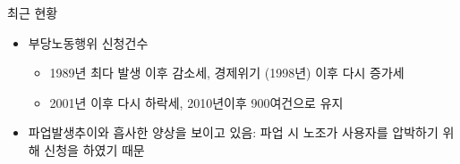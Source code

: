 \documentclass[aspectratio=169,xcolor=dvipsnames,handout]{beamer}
\begin{document}
\begin{frame}{최근 현황}
    \begin{itemize}[<+->]
        \item 부당노동행위 신청건수
        \begin{itemize}[<+->]
            \item 1989년 최다 발생 이후 감소세, 경제위기 (1998년) 이후 다시 증가세
            \item 2001년 이후 다시 하락세, 2010년이후 900여건으로 유지
        \end{itemize}
        \item 파업발생추이와 흡사한 양상을 보이고 있음: 파업 시 노조가 사용자를 압박하기 위해 신청을 하였기 때문
    \end{itemize}
\end{frame}

\end{document}
